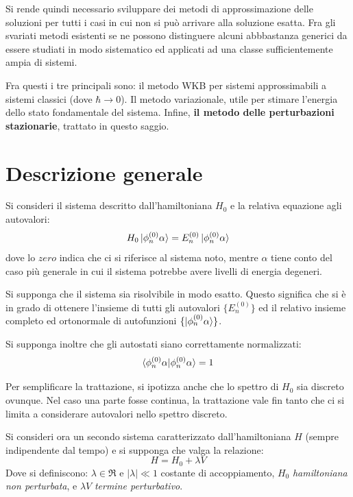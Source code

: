 \documentclass[a4paper, 10pt]{article}
\begin{document}
\begin{small}
Si rende quindi necessario sviluppare dei metodi di approssimazione delle soluzioni per tutti i casi in cui non si può arrivare alla soluzione esatta. Fra gli svariati metodi esistenti se ne possono distinguere alcuni abbbastanza generici da essere studiati in modo sistematico ed applicati ad una classe sufficientemente ampia di sistemi.

Fra questi i tre principali sono: il metodo WKB per sistemi approssimabili a sistemi classici (dove $\hbar \rightarrow 0$). Il metodo variazionale, utile per stimare l'energia dello stato fondamentale del sistema. Infine, \textbf{il metodo delle perturbazioni stazionarie}, trattato in questo saggio.
\end{small}


\section{Descrizione generale}
Si consideri il sistema descritto dall'hamiltoniana $H_0$ e la relativa equazione agli autovalori:
\begin{equation}
	\label{sistema-noto-full}
	H_0\ket{\phi_n^{(0)} \alpha} = E_n^{(0)}\ket{\phi_n^{(0)} \alpha}
\end{equation}
dove lo $zero$ indica che ci si riferisce al sistema noto, mentre $\alpha$ tiene conto del caso più generale in cui il sistema potrebbe avere livelli di energia degeneri.

Si supponga che il sistema sia risolvibile in modo esatto. Questo significa che si è in grado di ottenere l'insieme di tutti gli autovalori $\{E_n^{(0)}\}$ ed il relativo insieme completo ed ortonormale di autofunzioni $\{\ket{\phi_{n}^{(0)}\alpha}\}$.

Si supponga inoltre che gli autostati siano correttamente normalizzati: 
\begin{equation}
	\label{normalizzazione}
	\braket{\phi_n^{(0)} \alpha | \phi_n^{(0)} \alpha} = 1
\end{equation}

Per semplificare la trattazione, si ipotizza anche che lo spettro di $H_0$ sia discreto ovunque. Nel caso una parte fosse continua, la trattazione vale fin tanto che ci si limita a considerare autovalori nello spettro discreto.

Si consideri ora un secondo sistema caratterizzato dall'hamiltoniana $H$ (sempre indipendente dal tempo) e si supponga che valga la relazione:
\begin{equation}
	\label{hamiltoniana-perturbata}	
	H = H_0 + \lambda V
\end{equation}
Dove si definiscono: $\lambda \in \Re$ e $|\lambda| \ll 1$ costante di accoppiamento, $H_0$ \textit{hamiltoniana non perturbata}, e $\lambda V$ \textit{termine perturbativo}.
\end{document}
